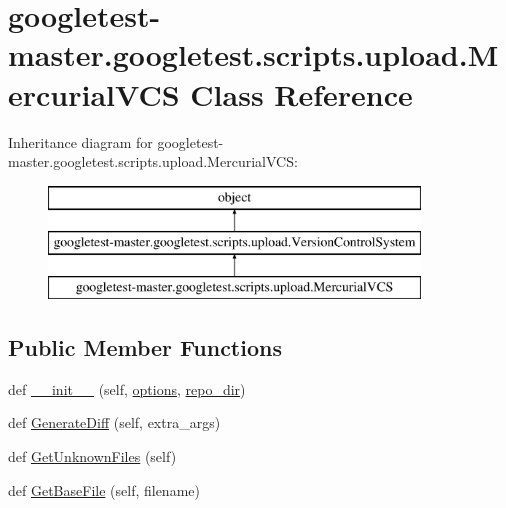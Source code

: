\hypertarget{classgoogletest-master_1_1googletest_1_1scripts_1_1upload_1_1_mercurial_v_c_s}{}\section{googletest-\/master.googletest.\+scripts.\+upload.\+Mercurial\+V\+CS Class Reference}
\label{classgoogletest-master_1_1googletest_1_1scripts_1_1upload_1_1_mercurial_v_c_s}
Inheritance diagram for googletest-\/master.googletest.\+scripts.\+upload.\+Mercurial\+V\+CS\+:\begin{figure}[H]
\begin{center}
\leavevmode
\includegraphics[height=3.000000cm]{d8/d8d/classgoogletest-master_1_1googletest_1_1scripts_1_1upload_1_1_mercurial_v_c_s}
\end{center}
\end{figure}
\subsection*{Public Member Functions}
\begin{DoxyCompactItemize}
\item 
def \mbox{\hyperlink{classgoogletest-master_1_1googletest_1_1scripts_1_1upload_1_1_mercurial_v_c_s_a9a727dfbcb0c2aaf8eac486d5faa68f0}{\+\_\+\+\_\+init\+\_\+\+\_\+}} (self, \mbox{\hyperlink{classgoogletest-master_1_1googletest_1_1scripts_1_1upload_1_1_version_control_system_ad426345e0518e3ca15ca7e9284e45754}{options}}, \mbox{\hyperlink{classgoogletest-master_1_1googletest_1_1scripts_1_1upload_1_1_mercurial_v_c_s_aa596c5ad540c93a1d0943eb4a9c3c127}{repo\+\_\+dir}})
\item 
def \mbox{\hyperlink{classgoogletest-master_1_1googletest_1_1scripts_1_1upload_1_1_mercurial_v_c_s_ab0fd31eda2de12901e484d6b1fea2673}{Generate\+Diff}} (self, extra\+\_\+args)
\item 
def \mbox{\hyperlink{classgoogletest-master_1_1googletest_1_1scripts_1_1upload_1_1_mercurial_v_c_s_a16c601bb13f3ae9b6f54239969f37095}{Get\+Unknown\+Files}} (self)
\item 
def \mbox{\hyperlink{classgoogletest-master_1_1googletest_1_1scripts_1_1upload_1_1_mercurial_v_c_s_a7a235347ff9c9a5b31c965b979c7fd45}{Get\+Base\+File}} (self, filename)
\end{DoxyCompactItemize}
